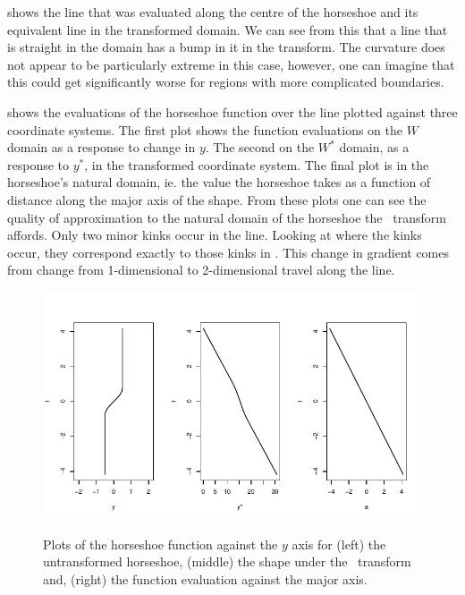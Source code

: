  shows the line that was evaluated along the centre of the horseshoe and its equivalent line in the transformed domain. We can see from this that a line that is straight in the domain has a bump in it in the transform. The curvature does not appear to be particularly extreme in this case, however, one can imagine that this could get significantly worse for regions with more complicated boundaries.

 shows the evaluations of the horseshoe function over the line plotted against three coordinate systems. The first plot shows the function evaluations on the $W$ domain as a response to change in $y$. The second on the $W^*$ domain, as a response to $y^*$, in the transformed coordinate system. The final plot is in the horseshoe's natural domain, ie. the value the horseshoe takes as a function of distance along the major axis of the shape. From these plots one can see the quality of approximation to the natural domain of the horseshoe the \sch\ transform affords. Only two minor kinks occur in the line. Looking at where the kinks occur, they correspond exactly to those kinks in . This change in gradient comes from change from 1-dimensional to 2-dimensional travel along the line.

\begin{figure}
\centering
\includegraphics[trim=0in 0in 0in 0in]{sc/figs/centrelinelineplots.pdf} \\
\caption{Plots of the horseshoe function against the $y$ axis for (left) the untransformed horseshoe, (middle) the shape under the \sch\ transform and, (right) the function evaluation against the major axis.}
\label{centrelinelineplot}
\end{figure}

